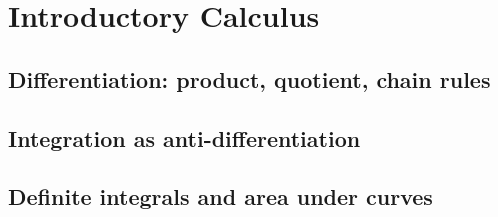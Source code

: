 
\section{Introductory Calculus}

\subsection{Differentiation: product, quotient, chain rules}


\subsection{Integration as anti-differentiation}


\subsection{Definite integrals and area under curves}

